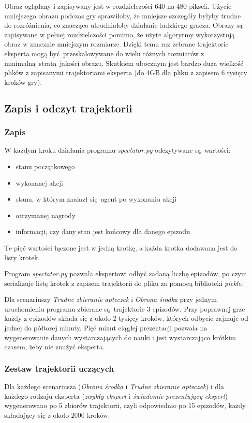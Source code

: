 Obraz oglądany i zapisywany jest w rozdzielczości 640 na 480 pikseli. Użycie mniejszego obrazu podczas gry sprawiłoby, że mniejsze szczegóły byłyby trudne do rozróżnienia, co znacząco utrudniałoby działanie ludzkiego gracza. Obrazy są zapisywane w pełnej rozdzielczości pomimo, że użyte algorytmy wykorzystują obraz w znacznie mniejszym rozmiarze. Dzięki temu raz zebrane trajektorie eksperta mogą być przeskalowywane do wielu różnych rozmiarów z minimalną stratą jakości obrazu. Skutkiem ubocznym jest bardzo duża wielkość plików z zapisanymi trajektoriami eksperta (do 4GB dla pliku z zapisem 6 tysięcy kroków gry).

\subsection{Zapis i odczyt trajektorii}
\subsubsection{Zapis}
W każdym kroku działania programu \textit{spectator.py} odczytywane są wartości:

\begin{itemize}
\item{stanu początkowego}
\item{wykonanej akcji}
\item{stanu, w którym znalazł się agent po wykonaniu akcji}
\item{otrzymanej nagrody}
\item{informacji, czy dany stan jest końcowy dla danego epizodu}
\end{itemize}

Te pięć wartości łączone jest w jedną krotkę, a każda krotka dodawana jest do listy krotek.

Program \textit{spectator.py} pozwala ekspertowi odbyć zadaną liczbę epizodów, po czym serializuje listę krotek z zapisem trajektorii do pliku za pomocą biblioteki \textit{pickle}.

Dla scenariuszy \textit{Trudne zbieranie apteczek} i \textit{Obrona środka} przy jednym uruchomieniu programu zbierane są trajektorie 3 epizodów. Przy poprawnej grze każdy z epizodów składa się z około 2 tysięcy kroków, których odbycie zajmuje od jednej do półtorej minuty. Pięć minut ciągłej prezentacji pozwala na wygenerowanie danych wystarczających do nauki i jest wystarczająco krótkim czasem, żeby nie znużyć eksperta.

\subsubsection{Zestaw trajektorii uczących}
Dla każdego scenariusza (\textit{Obrona środka} i \textit{Trudne zbieranie apteczek}) i dla każdego rodzaju eksperta (\textit{zwykły ekspert} i \textit{świadomie prezentujący ekspert}) wygenerowano po 5 zbiorów trajektorii, czyli odpowiednio po 15 epizodów, każdy składający się z około 2000 kroków.

